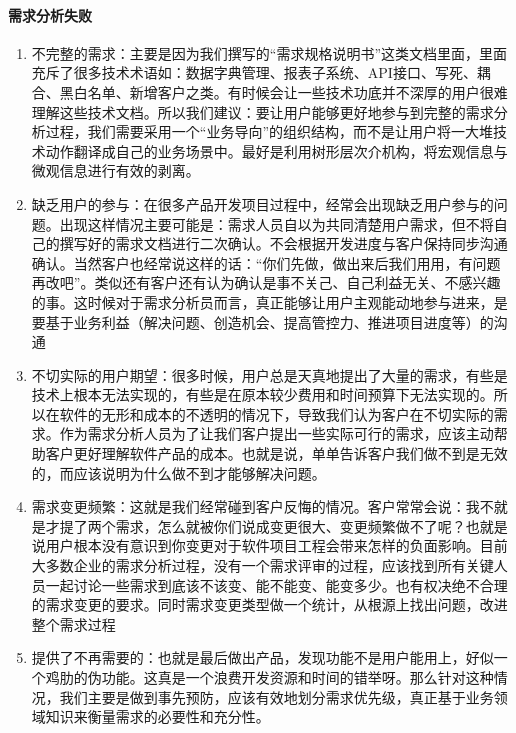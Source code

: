 \documentclass[letterpaper,10pt,english]{sphinxmanual}
\begin{document}
\paragraph{需求分析失败}
\label{\detokenize{chapter_knowledge/demand_analysis:id16}}\begin{enumerate}
%
\item {} 
不完整的需求：主要是因为我们撰写的“需求规格说明书”这类文档里面，里面充斥了很多技术术语如：数据字典管理、报表子系统、API接口、写死、耦合、黑白名单、新增客户之类。有时候会让一些技术功底并不深厚的用户很难理解这些技术文档。所以我们建议：要让用户能够更好地参与到完整的需求分析过程，我们需要采用一个“业务导向”的组织结构，而不是让用户将一大堆技术动作翻译成自己的业务场景中。最好是利用树形层次介机构，将宏观信息与微观信息进行有效的剥离。

\item {} 
缺乏用户的参与：在很多产品开发项目过程中，经常会出现缺乏用户参与的问题。出现这样情况主要可能是：需求人员自以为共同清楚用户需求，但不将自己的撰写好的需求文档进行二次确认。不会根据开发进度与客户保持同步沟通确认。当然客户也经常说这样的话：“你们先做，做出来后我们用用，有问题再改吧”。类似还有客户还有认为确认是事不关己、自己利益无关、不感兴趣的事。这时候对于需求分析员而言，真正能够让用户主观能动地参与进来，是要基于业务利益（解决问题、创造机会、提高管控力、推进项目进度等）的沟通

\item {} 
不切实际的用户期望：很多时候，用户总是天真地提出了大量的需求，有些是技术上根本无法实现的，有些是在原本较少费用和时间预算下无法实现的。所以在软件的无形和成本的不透明的情况下，导致我们认为客户在不切实际的需求。作为需求分析人员为了让我们客户提出一些实际可行的需求，应该主动帮助客户更好理解软件产品的成本。也就是说，单单告诉客户我们做不到是无效的，而应该说明为什么做不到才能够解决问题。

\item {} 
需求变更频繁：这就是我们经常碰到客户反悔的情况。客户常常会说：我不就是才提了两个需求，怎么就被你们说成变更很大、变更频繁做不了呢？也就是说用户根本没有意识到你变更对于软件项目工程会带来怎样的负面影响。目前大多数企业的需求分析过程，没有一个需求评审的过程，应该找到所有关键人员一起讨论一些需求到底该不该变、能不能变、能变多少。也有权决绝不合理的需求变更的要求。同时需求变更类型做一个统计，从根源上找出问题，改进整个需求过程

\item {} 
提供了不再需要的：也就是最后做出产品，发现功能不是用户能用上，好似一个鸡肋的伪功能。这真是一个浪费开发资源和时间的错举呀。那么针对这种情况，我们主要是做到事先预防，应该有效地划分需求优先级，真正基于业务领域知识来衡量需求的必要性和充分性。%
\begin{footnote}[547]\sphinxAtStartFootnote
{}
%
\end{footnote}

\end{enumerate}
\end{document}
